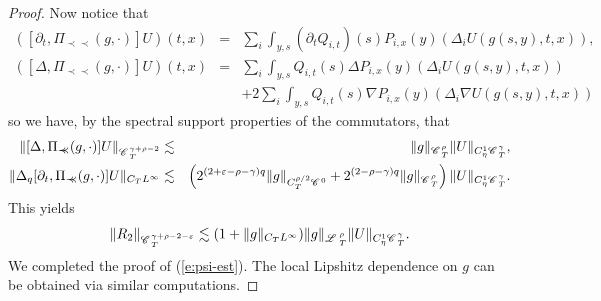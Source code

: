 \documentclass[11pt,reqno]{amsart}
\newcommand{\precprec}{\prec\!\!\!\prec}
\newcommand{\CC}{\mathscr{C} \hspace{.1em}}
\newcommand{\LL}{\mathscr{L} \hspace{.2em}}
\begin{document}
\begin{proof}
  Now notice that
  \begin{eqnarray}
    ([\partial_t, \Pi_{\precprec} (g, \cdot)] U) (t, x) & = & \sum_i \int_{y,
    s} (\partial_t Q_{i, t}) (s) P_{i, x} (y) (\Delta_i U (g (s, y), t, x)),
    \nonumber\\
    ([\Delta, \Pi_{\precprec} (g, \cdot)] U) (t, x) & = & \sum_i \int_{y, s}
    Q_{i, t} (s) \Delta P_{i, x} (y) (\Delta_i U (g (s, y), t, x)) 
    \label{eq:q-time}\\
    &  & + 2 \sum_i \int_{y, s} Q_{i, t} (s) \nabla P_{i, x} (y) (\Delta_i
    \nabla U (g (s, y), t, x)) \nonumber
  \end{eqnarray}
  so we have, by the spectral support properties of the commutators, that
  \begin{eqnarray*}
    \| [\Delta, \Pi_{\precprec} (g, \cdot)] U \|_{\CC_T^{\gamma + \rho - 2}} &
    \lesssim & \| g \|_{\CC^{\rho}_T} \| U \|_{C^1_{\eta} \CC^{\gamma}_T},\\
    \| \Delta_q [\partial_t, \Pi_{\precprec} (g, \cdot)] U \|_{C_T L^{\infty}}
    & \lesssim & \left( 2^{(2 + \varepsilon - \rho - \gamma) q} \| g
    \|_{C_T^{\rho / 2} \CC^0} + 2^{(2 - \rho - \gamma) q} \| g
    \|_{\CC^{\rho}_T} \right) \| U \|_{C^1_{\eta} \CC^{\gamma}_T} .
  \end{eqnarray*}
  This yields
  \[ \| R_2 \|_{\CC_T^{\gamma + \rho - 2 - \varepsilon}} \lesssim (1 + \| g
     \|_{C_T L^{\infty}}) \| g \|_{\LL^{\rho}_T} \| U \|_{C^1_{\eta}
     \CC^{\gamma}_T} . \]
  We completed the proof of (\ref{e:psi-est}). The local Lipshitz dependence
  on $g$ can be obtained via similar computations.
\end{proof}
\end{document}
